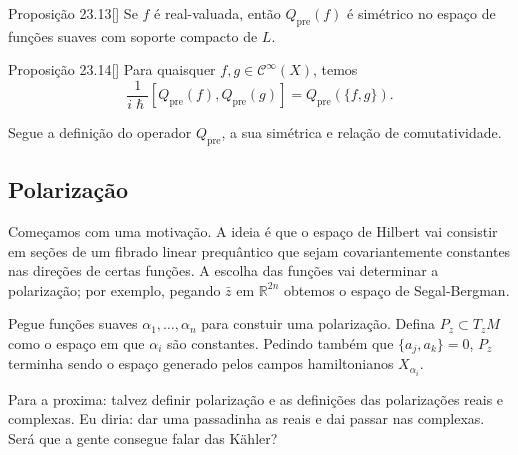 \begin{thing5}{Proposição 23.13}[\cite{hallq}]\leavevmode
Se $f$ é real-valuada, então $Q_{\operatorname{pre}}(f)$ é simétrico no espaço de funções suaves com soporte compacto de $L$.
\end{thing5}

\begin{thing5}{Proposição 23.14}[\cite{hallq}]\leavevmode
Para quaisquer $f,g \in \mathcal{C}^\infty(X)$, temos
\[\frac{1}{i\hslash}[Q_{\operatorname{pre}}(f),Q_{\operatorname{pre}}(g)]=Q_{\operatorname{pre}}(\{f,g\}).\]
\end{thing5}

Segue a definição do operador $Q_{\operatorname{pre}}$, a sua simétrica e relação de comutatividade.

\subsection{Polarização}

Começamos com uma motivação. A ideia é que o espaço de Hilbert vai consistir em seções de um fibrado linear prequântico que sejam covariantemente constantes nas direções de certas funções. A escolha das funções vai determinar a polarização; por exemplo, pegando $\bar{z}$ em $\mathbb{R}^{2n}$ obtemos o espaço de Segal-Bergman.

Pegue funções suaves $\alpha_1,\ldots,\alpha_n$ para constuir uma polarização. Defina $P_z\subset T_zM$  como o espaço em que $\alpha_i$ são constantes. Pedindo também que $\{a_j,a_k\}=0$, $P_z$ terminha sendo o espaço generado pelos campos hamiltonianos $X_{\alpha_i}$.

Para a proxima: talvez definir polarização e as definições das polarizações reais e complexas. Eu diria: dar uma passadinha as reais e dai passar nas complexas. Será que a gente consegue falar das Kähler?

\printbibliography


